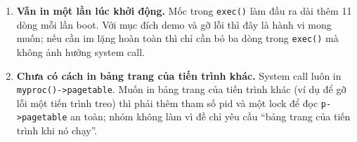 \begin{enumerate}[itemsep=2.5pt, topsep=2.5pt, leftmargin=1.5cm]
    \item \textbf{Vẫn in một lần lúc khởi động.} Mốc trong \texttt{exec()} làm đầu ra dài thêm 11 dòng mỗi lần boot. Với mục đích demo và gỡ lỗi thì đây là hành vi mong muốn; nếu cần im lặng hoàn toàn thì chỉ cần bỏ ba dòng trong \texttt{exec()} mà không ảnh hưởng system call.
    \item \textbf{Chưa có cách in bảng trang của tiến trình khác.} System call luôn in \texttt{myproc()->pagetable}. Muốn in bảng trang của tiến trình khác (ví dụ để gỡ lỗi một tiến trình treo) thì phải thêm tham số pid và một lock để đọc \texttt{p->pagetable} an toàn; nhóm không làm vì đề chỉ yêu cầu ``bảng trang của tiến trình khi nó chạy''.
\end{enumerate}
